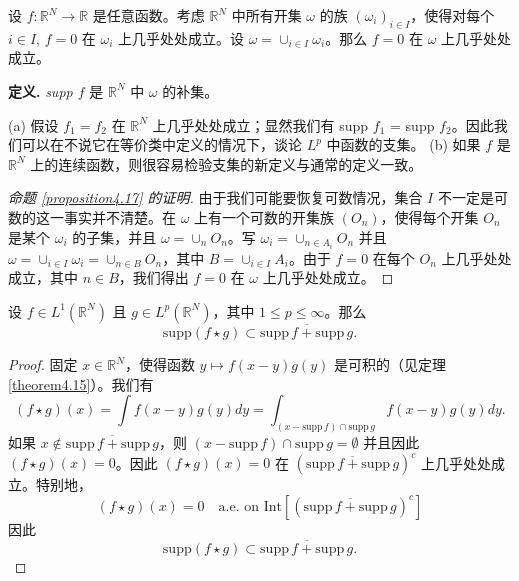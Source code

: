\begin{proposition}[以及支集的定义]\label{proposition4.17}
设 $f: \mathbb{R}^N \to \mathbb{R}$ 是任意函数。考虑 $\mathbb{R}^N$ 中所有开集 $\omega$ 的族 $(\omega_i)_{i \in I}$，使得对每个 $i \in I$, $f=0$ 在 $\omega_i$ 上几乎处处成立。设 $\omega = \cup_{i \in I} \omega_i$。那么 $f=0$ 在 $\omega$ 上几乎处处成立。
\end{proposition}

\textbf{定义.} \textit{supp $f$} 是 $\mathbb{R}^N$ 中 $\omega$ 的补集。

\begin{remark}
(a) 假设 $f_1 = f_2$ 在 $\mathbb{R}^N$ 上几乎处处成立；显然我们有 supp $f_1$ = supp $f_2$。因此我们可以在不说它在等价类中定义的情况下，谈论 $L^p$ 中函数的支集。
(b) 如果 $f$ 是 $\mathbb{R}^N$ 上的连续函数，则很容易检验支集的新定义与通常的定义一致。
\end{remark}

\begin{proof}[命题 \ref{proposition4.17} 的证明]
由于我们可能要恢复可数情况，集合 $I$ 不一定是可数的这一事实并不清楚。在 $\omega$ 上有一个可数的开集族 $(O_n)$，使得每个开集 $O_n$ 是某个 $\omega_i$ 的子集，并且 $\omega = \cup_n O_n$。写 $\omega_i = \cup_{n \in A_i} O_n$ 并且 $\omega = \cup_{i \in I} \omega_i = \cup_{n \in B} O_n$，其中 $B = \cup_{i \in I} A_i$。由于 $f=0$ 在每个 $O_n$ 上几乎处处成立，其中 $n \in B$，我们得出 $f=0$ 在 $\omega$ 上几乎处处成立。
\end{proof}

\begin{proposition}\label{proposition4.18}
设 $f \in L^1(\mathbb{R}^N)$ 且 $g \in L^p(\mathbb{R}^N)$，其中 $1 \le p \le \infty$。那么
\[ \mathrm{supp}(f \star g) \subset \overline{\mathrm{supp}\,f + \mathrm{supp}\,g}. \]
\end{proposition}

\begin{proof}
固定 $x \in \mathbb{R}^N$，使得函数 $y \mapsto f(x-y)g(y)$ 是可积的（见定理 \ref{theorem4.15}）。我们有
\[ (f \star g)(x) = \int f(x-y)g(y)dy = \int_{(x-\mathrm{supp}\,f) \cap \mathrm{supp}\,g} f(x-y)g(y)dy. \]
如果 $x \notin \overline{\mathrm{supp}\,f + \mathrm{supp}\,g}$，则 $(x-\mathrm{supp}\,f) \cap \mathrm{supp}\,g = \emptyset$ 并且因此 $(f \star g)(x) = 0$。因此 $(f \star g)(x) = 0$ 在 $(\overline{\mathrm{supp}\,f + \mathrm{supp}\,g})^c$ 上几乎处处成立。特别地，
\[ (f \star g)(x) = 0 \quad \text{a.e. on } \mathrm{Int}[(\overline{\mathrm{supp}\,f + \mathrm{supp}\,g})^c] \]
因此
\[ \mathrm{supp}(f \star g) \subset \overline{\mathrm{supp}\,f + \mathrm{supp}\,g}. \]
\end{proof}

